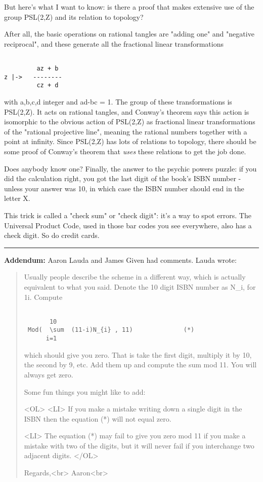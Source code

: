 But here's what I want to know: is there a proof that makes
extensive use of the group PSL(2,Z) and its relation to topology?

After all, the basic operations on rational tangles are "adding
one" and "negative reciprocal", and these generate all the 
fractional linear transformations


\begin{verbatim}

         az + b
z |->   --------
         cz + d
\end{verbatim}
    
with a,b,c,d integer and ad-bc = 1.  The group of these transformations
is PSL(2,Z).  It acts on rational tangles, and Conway's theorem says
this action is isomorphic to the obvious action of PSL(2,Z) as fractional
linear transformations of the "rational projective line", 
meaning the rational 
numbers together with a point at infinity.  Since PSL(2,Z) has lots of 
relations to topology, there should be some proof of Conway's theorem
that \emph{uses} these relations to get the job done.

Does anybody know one?
Finally, the answer to the psychic powers puzzle: if you did the 
calculation right, you got the last digit of the book's ISBN number - 
unless your answer was 10, in which case the ISBN number should end 
in the letter X.

This trick is called a "check sum" or "check digit": 
it's a way to spot 
errors.  The Universal Product Code, used in those bar codes you see
everywhere, also has a check digit.  So do credit cards.  

\par\noindent\rule{\textwidth}{0.4pt}
\textbf{Addendum:}  
Aaron Lauda and James Given had comments.  Lauda wrote:

\begin{quote}
Usually people describe the scheme in a different way, which is
actually equivalent to what you said.  Denote the 10 digit ISBN number 
as N_{i}, for 1\le i. Compute


\begin{verbatim}

       10
 Mod(  \sum  (11-i)N_{i} , 11)              (*)
      i=1
\end{verbatim}
    
which should give you zero.  That is take the first digit, multiply it by 
10, the second by 9, etc.  Add them up and compute the sum mod 11.  You 
will always get zero.

Some fun things you might like to add:

<OL>
<LI>
If you make a mistake writing down a single digit in the ISBN then the 
equation (*) will not equal zero.  

<LI>
 The equation (*) may fail to give you zero mod 11 if you make a mistake 
  with two of the digits, but it will never fail if you interchange two 
  adjacent digits.
</OL>

Regards,<br>
Aaron<br>
\end{quote}

